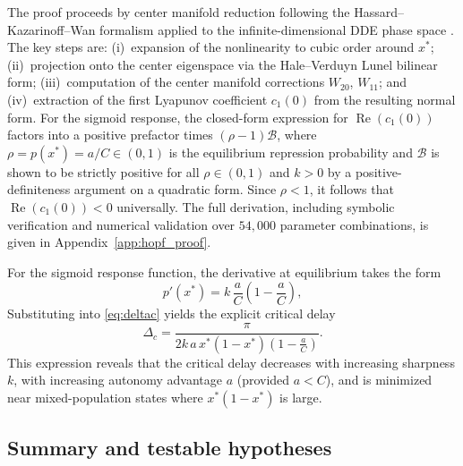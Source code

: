 The proof proceeds by center manifold reduction following the Hassard--Kazarinoff--Wan formalism \citep{hassard1981theory} applied to the infinite-dimensional DDE phase space \citep{hale1993introduction}. The key steps are: (i)~expansion of the nonlinearity to cubic order around $x^*$; (ii)~projection onto the center eigenspace via the Hale--Verduyn Lunel bilinear form; (iii)~computation of the center manifold corrections $W_{20}$, $W_{11}$; and (iv)~extraction of the first Lyapunov coefficient $c_1(0)$ from the resulting normal form. For the sigmoid response, the closed-form expression for $\operatorname{Re}(c_1(0))$ factors into a positive prefactor times $(\rho-1)\mathcal{B}$, where $\rho = p(x^*) = a/C \in (0,1)$ is the equilibrium repression probability and $\mathcal{B}$ is shown to be strictly positive for all $\rho\in(0,1)$ and $k>0$ by a positive-definiteness argument on a quadratic form. Since $\rho < 1$, it follows that $\operatorname{Re}(c_1(0))<0$ universally. The full derivation, including symbolic verification and numerical validation over $54{,}000$ parameter combinations, is given in Appendix~\ref{app:hopf_proof}.

For the sigmoid response function, the derivative at equilibrium takes the form
\begin{equation}
    p'(x^*) = k\,\frac{a}{C}\left(1-\frac{a}{C}\right),
\end{equation}
Substituting into \eqref{eq:deltac} yields the explicit critical delay
\begin{equation}
    \Delta_c =
    \frac{\pi}
    {2k\,a\,x^*(1-x^*)\left(1-\frac{a}{C}\right)}.
\label{eq:deltac_sigmoid}
\end{equation}
This expression reveals that the critical delay decreases with increasing sharpness $k$, with increasing autonomy advantage $a$ (provided $a<C$), and is minimized near mixed-population states where $x^*(1-x^*)$ is large.

\subsection{Summary and testable hypotheses}

